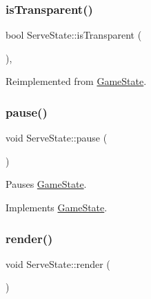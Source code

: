 \mbox{\label{class_serve_state_aad809c6fa11b502fa20403dc62b6601a}} 
\subsubsection{\texorpdfstring{isTransparent()}{isTransparent()}}
{\footnotesize\ttfamily bool Serve\+State\+::is\+Transparent (\begin{DoxyParamCaption}{ }\end{DoxyParamCaption})\hspace{0.3cm}{\ttfamily [inline]}, {\ttfamily [virtual]}}



Reimplemented from \mbox{\hyperlink{class_game_state_af75d6db30190901ed70704d18804fac7}{Game\+State}}.

\mbox{\label{class_serve_state_ab3a85411b4cc260cfede50e3aa10573c}} 
\subsubsection{\texorpdfstring{pause()}{pause()}}
{\footnotesize\ttfamily void Serve\+State\+::pause (\begin{DoxyParamCaption}{ }\end{DoxyParamCaption})\hspace{0.3cm}{\ttfamily [virtual]}}



Pauses \mbox{\hyperlink{class_game_state}{Game\+State}}. 



Implements \mbox{\hyperlink{class_game_state_aafc908582760099891b37bb380ddd87a}{Game\+State}}.

\mbox{\label{class_serve_state_a91cd889069e5b9f073ac33addeed2913}} 
\subsubsection{\texorpdfstring{render()}{render()}}
{\footnotesize\ttfamily void Serve\+State\+::render (\begin{DoxyParamCaption}\item[{\mbox{\hyperlink{class_game_engine}{Game\+Engine}} $\ast$}]{ }\end{DoxyParamCaption})\hspace{0.3cm}{\ttfamily [virtual]}}



